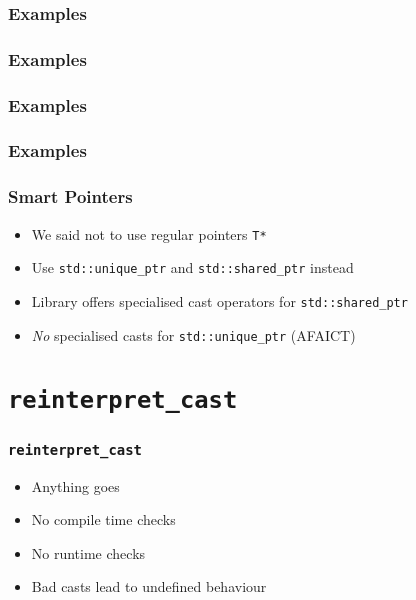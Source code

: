 \begin{frame}
  \frametitle{Examples}
\end{frame}

\begin{frame}
  \frametitle{Examples}
\end{frame}

\begin{frame}
  \frametitle{Examples}
\end{frame}

\begin{frame}
  \frametitle{Examples}
\end{frame}

\begin{frame}
  \frametitle{Smart Pointers}
  \begin{itemize}
    \item We said not to use regular pointers {\tt T*}
    \item Use {\tt std::unique\_ptr} and {\tt std::shared\_ptr} instead
    \item Library offers specialised cast operators for {\tt std::shared\_ptr}
    \item \emph{No} specialised casts for {\tt std::unique\_ptr} (AFAICT)
  \end{itemize}
\end{frame}

\section{{\tt reinterpret\_cast}}

\frame{\tableofcontents[currentsection]}


\begin{frame}
  \frametitle{{\tt reinterpret\_cast}}
  \begin{itemize}
    \item Anything goes
    \item No compile time checks
    \item No runtime checks
    \item Bad casts lead to undefined behaviour
  \end{itemize}
\end{frame}

